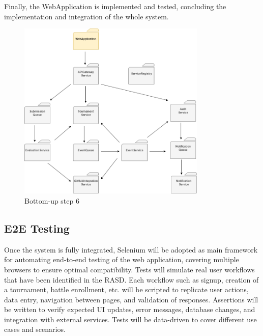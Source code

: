 Finally, the WebApplication is implemented and tested, concluding the implementation and integration of the whole system.
\begin{figure}[H]
    \centering
    \includegraphics[width=0.8\textwidth]{Diagrams/integration_6.png}
    \caption{Bottom-up step 6}
\end{figure}

\subsection{E2E Testing}

Once the system is fully integrated, Selenium will be adopted as main framework for automating end-to-end testing of the web application, covering multiple browsers to ensure optimal compatibility.
Tests will simulate real user workflows that have been identified in the RASD. Each workflow such as signup, creation of a tournament, battle enrollment, etc. will be scripted to replicate user actions, data entry, navigation between pages, and validation of responses.
Assertions will be written to verify expected UI updates, error messages, database changes, and integration with external services. Tests will be data-driven to cover different use cases and scenarios.
